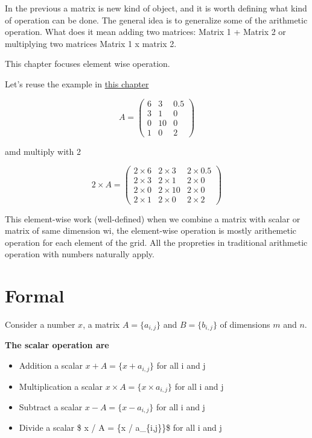 \documentclass[
  letterpaper,
  DIV=11,
  numbers=noendperiod]{scrreprt}
\providecommand{\tightlist}{%
  \setlength{\itemsep}{0pt}\setlength{\parskip}{0pt}}
\begin{document}
In the previous a matrix is new kind of object, and it is worth defining
what kind of operation can be done. The general idea is to generalize
some of the arithmetic operation. What does it mean adding two matrices:
Matrix 1 + Matrix 2 or multiplying two matrices Matrix 1 x matrix 2.

This chapter focuses element wise operation.

Let's reuse the example in \href{@sec-matrixMath}{this chapter}

\[
A =
\begin{pmatrix}
    6 & 3 & 0.5 \\
    3 & 1 & 0 \\
    0 & 10 & 0 \\
    1 & 0 & 2
\end{pmatrix}
\]

amd multiply with 2

\[
2 \times A =
\begin{pmatrix}
    2 \times 6 & 2 \times 3 & 2 \times 0.5 \\
    2 \times 3 & 2 \times 1 & 2 \times 0 \\
    2 \times 0 & 2 \times 10 & 2 \times 0 \\
    2 \times 1 & 2 \times 0 & 2 \times 2
\end{pmatrix}
\]

This element-wise work (well-defined) when we combine a matrix with
scalar or matrix of same dimension wi, the element-wise operation is
mostly arithemetic operation for each element of the grid. All the
propreties in traditional arithmetic operation with numbers naturally
apply.

\section*{Formal}\label{formal-5}


Consider a number \(x\), a matrix \(A = \{a_{i,j}\}\) and
\(B = \{b_{i,j}\}\) of dimensions \(m\) and \(n\).

\textbf{The scalar operation are}

\begin{itemize}
\tightlist
\item
  Addition a scalar \(x + A =  \{x + a_{i,j}\}\) for all i and j
\item
  Multiplication a scalar \(x \times A =  \{x \times a_{i,j}\}\) for all
  i and j
\item
  Subtract a scalar \(x - A =  \{x - a_{i,j}\}\) for all i and j
\item
  Divide a scalar \$ x / A = \{x / a\_\{i,j\}\}\$ for all i and j
\end{itemize}
\end{document}
